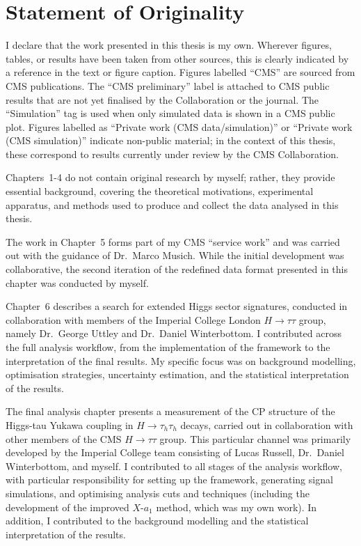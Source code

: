 \documentclass[12pt, a4paper, twoside]{report}
\begin{document}
\chapter*{Statement of Originality}

I declare that the work presented in this thesis is my own. Wherever figures, tables, or results have been taken from other sources, this is clearly indicated by a reference in the text or figure caption. Figures labelled ``CMS'' are sourced from CMS publications. The ``CMS preliminary'' label is attached to CMS public results that are not yet finalised by the Collaboration or the journal. The ``Simulation'' tag is used when only simulated data is shown in a CMS public plot. Figures labelled as ``Private work (CMS data/simulation)'' or ``Private work (CMS simulation)'' indicate non-public material; in the context of this thesis, these correspond to results currently under review by the CMS Collaboration. 

Chapters~1-4 do not contain original research by myself; rather, they provide essential background, covering the theoretical motivations, experimental apparatus, and methods used to produce and collect the data analysed in this thesis.  

The work in Chapter~5 forms part of my CMS ``service work'' and was carried out with the guidance of Dr.~Marco Musich. While the initial development was collaborative, the second iteration of the redefined data format presented in this chapter was conducted by myself.  

Chapter~6 describes a search for extended Higgs sector signatures, conducted in collaboration with members of the Imperial College London $H\to\tau\tau$ group, namely Dr.~George Uttley and Dr.~Daniel Winterbottom. I contributed across the full analysis workflow, from the implementation of the framework to the interpretation of the final results. My specific focus was on background modelling, optimisation strategies, uncertainty estimation, and the statistical interpretation of the results.  

The final analysis chapter presents a measurement of the CP structure of the Higgs-tau Yukawa coupling in $H\to\tau_h\tau_h$ decays, carried out in collaboration with other members of the CMS $H\to\tau\tau$ group. This particular channel was primarily developed by the Imperial College team consisting of Lucas Russell, Dr.~Daniel Winterbottom, and myself. I contributed to all stages of the analysis workflow, with particular responsibility for setting up the framework, generating signal simulations, and optimising analysis cuts and techniques (including the development of the improved $X$-$a_1$ method, which was my own work). In addition, I contributed to the background modelling and the statistical interpretation of the results.  
\end{document}
